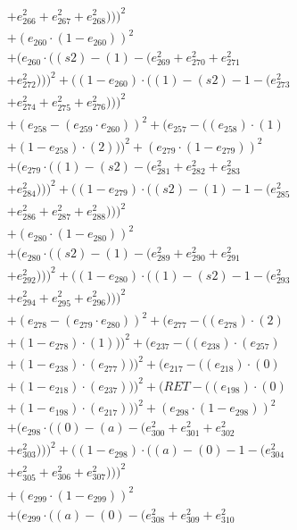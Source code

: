 \documentclass[10pt, a4paper]{article}
\begin{document}
\begin{align*}
& + e_{266}^{2} + e_{267}^{2} + e_{268}^{2})))^{2} \\
& + (e_{260}  \cdot  (1 - e_{260}))^{2} \\
& + (e_{260}  \cdot  ((s2) - (1) - (e_{269}^{2} + e_{270}^{2} + e_{271}^{2} \\
& + e_{272}^{2})))^{2} + ((1 - e_{260})  \cdot  ((1) - (s2) - 1 - (e_{273}^{2} \\
& + e_{274}^{2} + e_{275}^{2} + e_{276}^{2})))^{2} \\
& + (e_{258} - (e_{259}  \cdot  e_{260}))^{2} + (e_{257} - ((e_{258})  \cdot  (1) \\
& + (1 - e_{258})  \cdot  (2)))^{2} + (e_{279}  \cdot  (1 - e_{279}))^{2} \\
& + (e_{279}  \cdot  ((1) - (s2) - (e_{281}^{2} + e_{282}^{2} + e_{283}^{2} \\
& + e_{284}^{2})))^{2} + ((1 - e_{279})  \cdot  ((s2) - (1) - 1 - (e_{285}^{2} \\
& + e_{286}^{2} + e_{287}^{2} + e_{288}^{2})))^{2} \\
& + (e_{280}  \cdot  (1 - e_{280}))^{2} \\
& + (e_{280}  \cdot  ((s2) - (1) - (e_{289}^{2} + e_{290}^{2} + e_{291}^{2} \\
& + e_{292}^{2})))^{2} + ((1 - e_{280})  \cdot  ((1) - (s2) - 1 - (e_{293}^{2} \\
& + e_{294}^{2} + e_{295}^{2} + e_{296}^{2})))^{2} \\
& + (e_{278} - (e_{279}  \cdot  e_{280}))^{2} + (e_{277} - ((e_{278})  \cdot  (2) \\
& + (1 - e_{278})  \cdot  (1)))^{2} + (e_{237} - ((e_{238})  \cdot  (e_{257}) \\
& + (1 - e_{238})  \cdot  (e_{277})))^{2} + (e_{217} - ((e_{218})  \cdot  (0) \\
& + (1 - e_{218})  \cdot  (e_{237})))^{2} + (RET - ((e_{198})  \cdot  (0) \\
& + (1 - e_{198})  \cdot  (e_{217})))^{2} + (e_{298}  \cdot  (1 - e_{298}))^{2} \\
& + (e_{298}  \cdot  ((0) - (a) - (e_{300}^{2} + e_{301}^{2} + e_{302}^{2} \\
& + e_{303}^{2})))^{2} + ((1 - e_{298})  \cdot  ((a) - (0) - 1 - (e_{304}^{2} \\
& + e_{305}^{2} + e_{306}^{2} + e_{307}^{2})))^{2} \\
& + (e_{299}  \cdot  (1 - e_{299}))^{2} \\
& + (e_{299}  \cdot  ((a) - (0) - (e_{308}^{2} + e_{309}^{2} + e_{310}^{2} \\

\end{align*}
\end{document}
